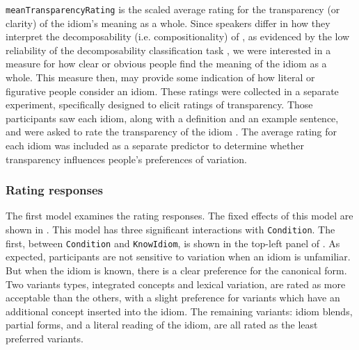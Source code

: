 \documentclass[output=paper
,modfonts
,nonflat]{langsci/langscibook}
\begin{document}
\texttt{meanTransparencyRating} is the scaled average rating for the transparency (or clarity) of the idiom's meaning as a whole. Since speakers differ in how they interpret the decomposability (i.e. compositionality)  of , as evidenced by the low reliability of the decomposability classification task \citep{TitoneConnine1994, TabossiEtAl2008}, we were interested in a measure for how clear or obvious people find the meaning of the idiom as a whole. This measure then, may provide some indication of how literal or figurative people consider an idiom. These ratings were collected in a separate experiment, specifically designed to elicit ratings of transparency. Those participants saw each idiom, along with a definition and an example sentence, and were asked to rate the transparency of the idiom \citep[for further details, see][]{Geeraert2016}. The average rating for each idiom was included as a separate predictor to determine whether transparency influences people's preferences of variation. 



\subsubsection{Rating responses}

The first model examines the rating responses. The fixed effects of this model are shown in . This model has three significant interactions with \texttt{Condition}. The first, between \texttt{Condition} and \texttt{KnowIdiom}, is shown in the top-left panel of . As expected, participants are not sensitive to variation  when an idiom is unfamiliar. But when the idiom  is known, there is a clear preference for the canonical form. Two variants types, integrated concepts  and lexical variation,  are rated as more acceptable  than the others, with a slight preference for variants which have an additional concept inserted into the idiom. The remaining variants: idiom blends,  partial forms,  and a literal reading  of the idiom, are all rated as the least preferred variants.
\end{document}
